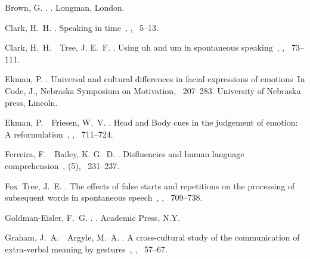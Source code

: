\documentclass[japanese]{jnlp_1.3a}
\begin{document}

\begin{thebibliography}{}

Brown, G. \BBCP.
.
\newblock Longman, London.

Clark, H.~H. \BBCP.
\newblock \BBOQ Speaking in time\BBCQ\
, {}, \mbox{\BPGS\ 5--13}.

Clark, H.~H.\BBACOMMA\ \BBA\ Tree, J. E.~F. \BBOP 2002\BBCP.
\newblock \BBOQ Using uh and um in spontaneous speaking\BBCQ\
, {}, \mbox{\BPGS\ 73--111}.

Ekman, P. \BBCP.
\newblock \BBOQ Universal and cultural differences in facial expressions of
  emotions\BBCQ\
\newblock In Code, J.\BED, {\Bem Nebraska Symposium on Motivation},
  \mbox{\BPGS\ 207--283}. University of Nebraska press, Lincoln.

Ekman, P.\BBACOMMA\ \BBA\ Friesen, W.~V. \BBOP 1967\BBCP.
\newblock \BBOQ Head and Body cues in the judgement of emotion: A
  reformulation\BBCQ\
, {}, \mbox{\BPGS\
  711--724}.

Ferreira, F.\BBACOMMA\ \BBA\ Bailey, K. G.~D. \BBOP 2004\BBCP.
\newblock \BBOQ Disfluencies and human language comprehension\BBCQ\
, {}(5), \mbox{\BPGS\
  231--237}.

Fox~Tree, J.~E. \BBCP.
\newblock \BBOQ The effects of false starts and repetitions on the processing
  of subsequent words in spontaneous speech\BBCQ\
, {}, \mbox{\BPGS\
  709--738}.

Goldman-Eisler, F.~G. \BBOP 1968\BBCP.
.
\newblock Academic Press, N.Y.

Graham, J.~A.\BBACOMMA\ \BBA\ Argyle, M.~A. \BBOP 1975\BBCP.
\newblock \BBOQ A cross-cultural study of the communication of extra-verbal
  meaning by gestures\BBCQ\
, {}, \mbox{\BPGS\
  57--67}.


\end{thebibliography}
\end{document}
